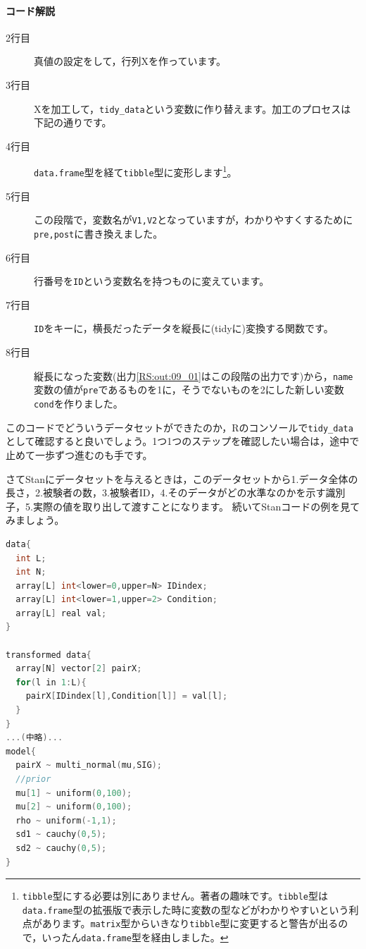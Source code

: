 \documentclass{ltjsbook}
\begin{document}
\paragraph{コード解説}
\begin{description}
	\item[2行目] 真値の設定をして，行列Xを作っています。
	\item[3行目] Xを加工して，\verb|tidy_data|という変数に作り替えます。加工のプロセスは下記の通りです。
	\item[4行目] \verb|data.frame|型を経て\verb|tibble|型に変形します\footnote{\verb|tibble|型にする必要は別にありません。著者の趣味です。\verb|tibble|型は\verb|data.frame|型の拡張版で表示した時に変数の型などがわかりやすいという利点があります。\verb|matrix|型からいきなり\verb|tibble|型に変更すると警告が出るので，いったん\verb|data.frame|型を経由しました。}。
	\item[5行目] この段階で，変数名が\verb|V1,V2|となっていますが，わかりやすくするために\verb|pre,post|に書き換えました。
	\item[6行目] 行番号を\verb|ID|という変数名を持つものに変えています。
	\item[7行目] \verb|ID|をキーに，横長だったデータを縦長に(tidyに)変換する関数です。
	\item[8行目] 縦長になった変数(出力\ref{RS:out:09_01}はこの段階の出力です)から，\verb|name|変数の値が\verb|pre|であるものを1に，そうでないものを2にした新しい変数\verb|cond|を作りました。
\end{description}
このコードでどういうデータセットができたのか，Rのコンソールで\verb|tidy_data|として確認すると良いでしょう。1つ1つのステップを確認したい場合は，途中で止めて一歩ずつ進むのも手です。

さてStanにデータセットを与えるときは，このデータセットから1.データ全体の長さ，2.被験者の数，3.被験者ID，4.そのデータがどの水準なのかを示す識別子，5.実際の値を取り出して渡すことになります。
続いてStanコードの例を見てみましょう。

\begin{lstlisting}[language=C++,label={stan:09_05},caption={整然データ対応版}]
data{
  int L;
  int N;
  array[L] int<lower=0,upper=N> IDindex;
  array[L] int<lower=1,upper=2> Condition;
  array[L] real val;
}

transformed data{
  array[N] vector[2] pairX;
  for(l in 1:L){
    pairX[IDindex[l],Condition[l]] = val[l];
  }
}
...(中略)...
model{
  pairX ~ multi_normal(mu,SIG);
  //prior
  mu[1] ~ uniform(0,100);
  mu[2] ~ uniform(0,100);
  rho ~ uniform(-1,1);
  sd1 ~ cauchy(0,5);
  sd2 ~ cauchy(0,5);
}

\end{lstlisting}
\end{document}
